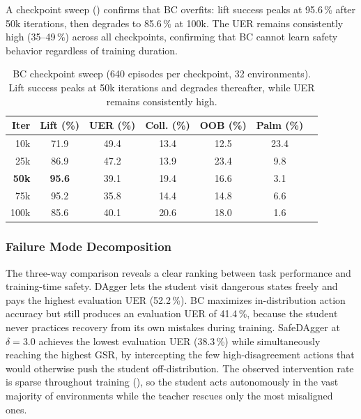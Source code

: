 A checkpoint sweep () confirms that BC overfits: lift success peaks at 95.6\,\% after 50k iterations, then degrades to 85.6\,\% at 100k.
The \ac{UER} remains consistently high (35--49\,\%) across all checkpoints, confirming that BC cannot learn safety behavior regardless of training duration.

\begin{table}[htb]
    \centering
    \caption{BC checkpoint sweep (640 episodes per checkpoint, 32 environments). Lift success peaks at 50k iterations and degrades thereafter, while \acs{UER} remains consistently high.}
    \label{tab:bc_overfitting}
    \begin{tabular}{rcccccc}
        \toprule
        \textbf{Iter} & \textbf{Lift (\%)} & \textbf{UER (\%)} & \textbf{Coll. (\%)} & \textbf{OOB (\%)} & \textbf{Palm (\%)} \\
        \midrule
        10k  & 71.9 & 49.4 & 13.4 & 12.5 & 23.4 \\
        25k  & 86.9 & 47.2 & 13.9 & 23.4 &  9.8 \\
        \textbf{50k}  & \textbf{95.6} & 39.1 & 19.4 & 16.6 &  3.1 \\
        75k  & 95.2 & 35.8 & 14.4 & 14.8 &  6.6 \\
        100k & 85.6 & 40.1 & 20.6 & 18.0 &  1.6 \\
        \bottomrule
    \end{tabular}
\end{table}

\subsubsection{Failure Mode Decomposition}%
\label{sec:safety_analysis}%

The three-way comparison reveals a clear ranking between task performance and training-time safety.
DAgger lets the student visit dangerous states freely and pays the highest evaluation \ac{UER} (52.2\,\%).
\ac{BC} maximizes in-distribution action accuracy but still produces an evaluation \ac{UER} of 41.4\,\%, because the student never practices recovery from its own mistakes during training.
SafeDAgger at $\delta = 3.0$ achieves the lowest evaluation \ac{UER} (38.3\,\%) while simultaneously reaching the highest \ac{GSR}, by intercepting the few high-disagreement actions that would otherwise push the student off-distribution.
The observed intervention rate is sparse throughout training (), so the student acts autonomously in the vast majority of environments while the teacher rescues only the most misaligned ones.

